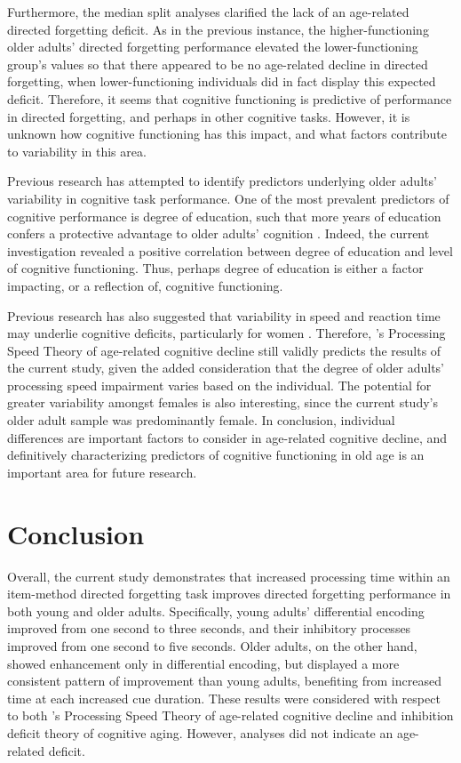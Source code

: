 \documentclass[man]{apa6}
\begin{document}
Furthermore, the median split analyses clarified the lack of an age-related directed forgetting deficit. As in the previous instance, the higher-functioning older adults’ directed forgetting performance elevated the lower-functioning group’s values so that there appeared to be no age-related decline in directed forgetting, when lower-functioning individuals did in fact display this expected deficit. Therefore, it seems that cognitive functioning is predictive of performance in directed forgetting, and perhaps in other cognitive tasks. However, it is unknown how cognitive functioning has this impact, and what factors contribute to variability in this area.

Previous research has attempted to identify predictors underlying older adults’ variability in cognitive task performance. One of the most prevalent predictors of cognitive performance is degree of education, such that more years of education confers a protective advantage to older adults’ cognition \parencite{christensen.et.al1999,anstey.christensen2000,christensen2001}. Indeed, the current investigation revealed a positive correlation between degree of education and level of cognitive functioning. Thus, perhaps degree of education is either a factor impacting, or a reflection of, cognitive functioning.

Previous research has also suggested that variability in speed and reaction time may underlie cognitive deficits, particularly for women \parencite{morse1993,christensen.et.al1999,christensen2001}. Therefore, \textcite{salthouse1996}'s Processing Speed Theory of age-related cognitive decline still validly predicts the results of the current study, given the added consideration that the degree of older adults’ processing speed impairment varies based on the individual. The potential for greater variability amongst females is also interesting, since the current study’s older adult sample was predominantly female. In conclusion, individual differences are important factors to consider in age-related cognitive decline, and definitively characterizing predictors of cognitive functioning in old age is an important area for future research.

\section*{Conclusion}

Overall, the current study demonstrates that increased processing time within an item-method directed forgetting task improves directed forgetting performance in both young and older adults. Specifically, young adults’ differential encoding improved from one second to three seconds, and their inhibitory processes improved from one second to five seconds. Older adults, on the other hand, showed enhancement only in differential encoding, but displayed a more consistent pattern of improvement than young adults, benefiting from increased time at each increased cue duration. These results were considered with respect to both \textcite{salthouse1996}'s Processing Speed Theory of age-related cognitive decline and \textcite{hasher.zacks1988} inhibition deficit theory of cognitive aging. However, analyses did not indicate an age-related deficit.
\end{document}
